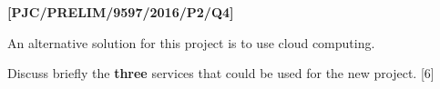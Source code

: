 \item \textbf{{[}PJC/PRELIM/9597/2016/P2/Q4{]} }

An alternative solution for this project is to use cloud computing. 

Discuss briefly the \textbf{three} services that could be used for
the new project. \hfill{}{[}6{]}